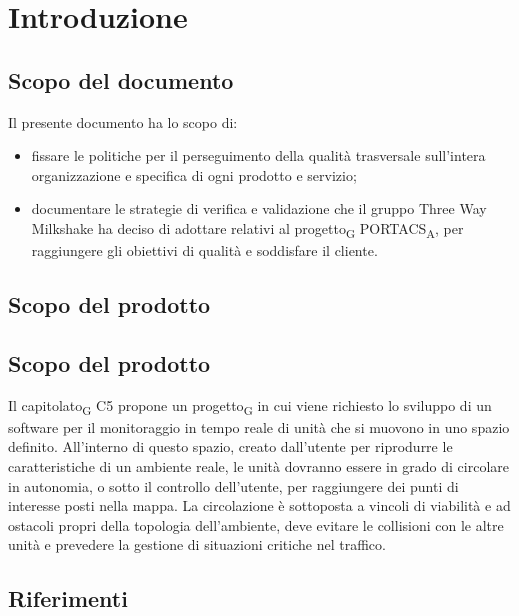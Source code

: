 \section{Introduzione}
\subsection{Scopo del documento}
    Il presente documento ha lo scopo di:
    \begin{itemize}
        \item fissare le politiche per il perseguimento della qualità trasversale sull'intera organizzazione e specifica di ogni prodotto e servizio;
        \item documentare le strategie di verifica e validazione che il gruppo Three Way Milkshake ha deciso di adottare relativi al \gls{progetto}\textsubscript{G} PORTACS\textsubscript{A}, per raggiungere gli obiettivi di qualità e soddisfare il cliente.
    \end{itemize}


\subsection{Scopo del prodotto}
    \subsection{Scopo del prodotto}
    Il \gls{capitolato}\textsubscript{G} C5 propone un \gls{progetto}\textsubscript{G} in cui viene richiesto lo sviluppo di un software per il monitoraggio in tempo reale di unità che si muovono in uno spazio definito. All'interno di questo spazio, creato dall'utente per riprodurre le caratteristiche di un ambiente reale, le unità dovranno essere in grado di circolare in autonomia, o sotto il controllo dell'utente, per raggiungere dei punti di interesse posti nella mappa.  La circolazione è sottoposta a vincoli di viabilità e ad ostacoli propri della topologia dell'ambiente, deve evitare le collisioni con le altre unità e prevedere la gestione di situazioni critiche nel traffico.

\subsection{Riferimenti}
\label{ref}
